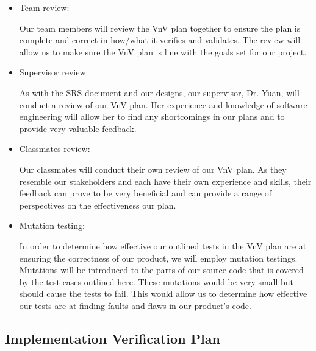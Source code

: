 \documentclass[12pt, titlepage]{article}
\begin{document}
\begin{itemize}
  \item Team review:

      Our team members will review the VnV plan together to ensure the plan is complete and correct in how/what it verifies and validates. The review will allow us to make sure the VnV plan is line with the goals set for our project.
  
  \item Supervisor review:

      As with the SRS document and our designs, our supervisor, Dr. Yuan, will conduct a review of our VnV plan. Her experience and knowledge of software engineering will allow her to find any shortcomings in our plans and to provide very valuable feedback.

  \item Classmates review:

      Our classmates will conduct their own review of our VnV plan. As they resemble our stakeholders and each have their own experience and skills, their feedback can prove to be very beneficial and can provide a range of perspectives on the effectiveness our plan.

  \item Mutation testing:

      In order to determine how effective our outlined tests in the VnV plan are at ensuring the correctness of our product, we will employ mutation testings. Mutations will be introduced to the parts of our source code that is covered by the test cases outlined here. These mutations would be very small but should cause the tests to fail. This would allow us to determine how effective our tests are at finding faults and flaws in our product's code.

\end{itemize}

\subsection{Implementation Verification Plan}
\end{document}
